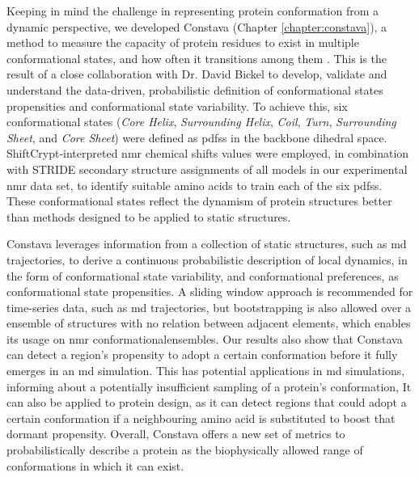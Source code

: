 Keeping in mind the challenge in representing protein \gls{conformation} from a dynamic perspective, we developed Constava (Chapter \ref{chapter:constava}), a method to measure the capacity of protein residues to exist in multiple conformational states, and how often it transitions among them \cite{gavalda-garcia_data-driven_2024}. This is the result of a close collaboration with Dr. David Bickel to develop, validate and understand the data-driven, probabilistic definition of conformational states propensities and conformational state variability. To achieve this, six conformational states (\textit{Core Helix}, \textit{Surrounding Helix}, \textit{Coil}, \textit{Turn}, \textit{Surrounding Sheet}, and \textit{Core Sheet}) were defined as \glspl{pdf}s in the backbone dihedral space. ShiftCrypt-interpreted \gls{nmr} chemical shifts \cite{orlando_shiftcrypt_2020} values were employed, in combination with STRIDE \cite{frishman_knowledge-based_1995} secondary structure assignments of all models in our experimental \gls{nmr} data set, to identify suitable amino acids to train each of the six \glspl{pdf}s. These conformational states reflect the dynamism of protein structures better than methods designed to be applied to static structures.


Constava leverages information from a collection of static structures, such as \gls{md} trajectories, to derive a continuous probabilistic description of local \gls{dynamics}, in the form of conformational state variability, and conformational preferences, as conformational state propensities. A sliding window approach is recommended for time-series data, such as \gls{md} trajectories, but bootstrapping is also allowed over a ensemble of structures with no relation between adjacent elements, which enables its usage on \gls{nmr} \glspl{conformationalensemble}. Our results also show that Constava can detect a region's propensity to adopt a certain \gls{conformation} before it fully emerges in an \gls{md} simulation. This has potential applications in \gls{md} simulations, informing about a potentially insufficient sampling of a protein's \gls{conformation}, It can also be applied to protein design, as it can detect regions that could adopt a certain \gls{conformation} if a neighbouring amino acid is substituted to boost that dormant propensity. Overall, Constava offers a new set of metrics to probabilistically describe a protein as the biophysically allowed range of \glspl{conformation} in which it can exist.
